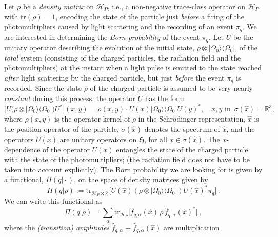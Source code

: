 \documentclass[11pt]{article}
\begin{document}
Let $\rho$ be a \textit{density matrix} on $\mathcal{H}_P$, i.e., a non-negative trace-class operator on $\mathcal{H}_P$ with 
$\text{tr}(\rho) = 1$, encoding the state of the particle just \textit{before} a firing of the photomultipliers caused by light scattering 
and the recording of an event $\pi_{q}$. We are interested in determining the \textit{Born probability} 
of the event $\pi_{q}$. Let $U$ be the unitary operator describing the evolution of the initial state, 
\mbox{$\rho \otimes | \Omega_0\rangle \langle \Omega_0 |$}, of the \textit{total} system (consisting of the charged particles, 
the radiation field and the photomultipliers) at the instant when a light pulse is emitted to the state reached \textit{after} 
light scattering by the charged particle, but just \textit{before} the event $\pi_{q}$ is recorded. 
Since the state $\rho$ of the charged particle is assumed to be very nearly \textit{constant} during this process, 
the operator $U$ has the form
\begin{equation}\label{Q-meas}
\big[U\big(\rho \otimes | \Omega_0\rangle \langle \Omega_0 |\big)U^{*}\big](x,y) = \rho(x,y) \cdot U(x) 
| \Omega_0\rangle \langle \Omega_0| U(y)^{*}, \quad x, y \text{ in } \,\sigma(\hat{x})=\mathbb{R}^{3},
\end{equation}
where $\rho(x,y)$ is the operator kernel of $\rho$ in the Schr\"odinger representation, $\hat{x}$ is the position operator of 
the particle, $\sigma(\hat{x})$ denotes the spectrum of $\hat{x}$, and the operators $U(x)$  are unitary operators on 
$\mathfrak{H}$, for all $x\in \sigma(\hat{x})$. 
The $x$-dependence of the operator $U(x)$ entangles the state of the charged particle with the state of the 
photomultipliers; (the radiation field does not have to be taken into account explicitly). The Born probability we are looking 
for is given by a functional, $\Pi(q\vert \cdot)$, on the space of density matrices given by
\begin{equation}\label{Born}
\Pi(q \vert \rho) := \text{tr}_{\mathcal{H}_{P}\otimes \mathfrak{H}} \Big[U(\hat{x})(\rho \otimes |\Omega_0\rangle \langle \Omega_0 |)U(\hat{x})^{*} \pi_{q}\Big]\,.
\end{equation}
We can write this functional as 
\begin{equation}\label{amplitudes}
\Pi(q \vert \rho) = \sum_{\alpha} \text{tr}_{\mathcal{H}_P} \Big[\widehat{f}_{q, \alpha}(\hat{x})\, \rho\, \widehat{f}_{q,\alpha}(\hat{x})^{*}\Big]\,,
\end{equation}
where the \textit{(transition) amplitudes} $\widehat{f}_{q, \alpha} \equiv \widehat{f}_{q,\alpha}(\hat{x})$ are multiplication 
\end{document}
